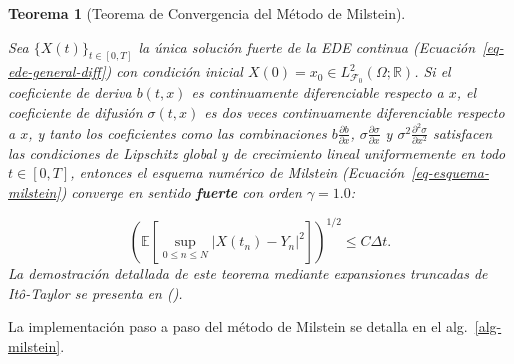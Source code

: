 \documentclass[
  spanish,
  letterpaper,
  DIV=11,
  numbers=noendperiod]{scrreprt}
\theoremstyle{plain}
\theoremstyle{plain}
\newtheorem{theorem}{Teorema}[chapter]
\theoremstyle{plain}
\theoremstyle{definition}
\theoremstyle{remark}
\begin{document}
\begin{theorem}[Teorema de Convergencia del Método de
Milstein]\protect\hypertarget{thm-milstein}{}\label{thm-milstein}

Sea \(\{X(t)\}_{t \in [0, T]}\) la única solución fuerte de la EDE
continua (Ecuación~\ref{eq-ede-general-diff}) con condición inicial
\(X(0) = x_0 \in L^2_{\mathcal{F}_0}(\Omega; \mathbb{R})\). Si el
coeficiente de deriva \(b(t, x)\) es continuamente diferenciable
respecto a \(x\), el coeficiente de difusión \(\sigma(t, x)\) es dos
veces continuamente diferenciable respecto a \(x\), y tanto los
coeficientes como las combinaciones
\(\displaystyle b\frac{\partial b}{\partial x}\),
\(\displaystyle \sigma\frac{\partial \sigma}{\partial x}\) y
\(\displaystyle \sigma^2\frac{\partial^2 \sigma}{\partial x^2}\)
satisfacen las condiciones de Lipschitz global y de crecimiento lineal
uniformemente en todo \(t \in [0, T]\), entonces el esquema numérico de
Milstein (Ecuación~\ref{eq-esquema-milstein}) converge en sentido
\textbf{fuerte} con orden \(\gamma = 1.0\):

\[
\left( \mathbb{E}\left[ \sup_{0 \le n \le N} \vert X(t_n) - Y_n \vert^2 \right] \right)^{1/2} \le C \Delta t.
\] La demostración detallada de este teorema mediante expansiones
truncadas de Itô-Taylor se presenta en
().

\end{theorem}

La implementación paso a paso del método de Milstein se detalla en el
alg.~\ref{alg-milstein}.
\end{document}
